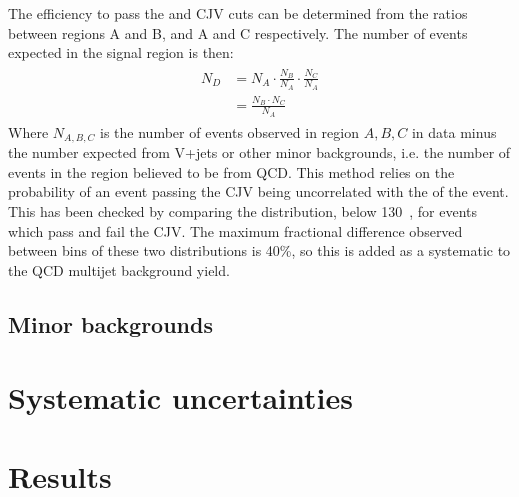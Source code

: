 The efficiency to pass the \MET and \ac{CJV} cuts can be determined from the ratios between regions A and B, and A and C respectively. The number of events expected in the signal region is then:
\begin{align}
  \label{eq:abcd}
  \begin{split}
  N_{D}&=N_{A}\cdot\frac{N_{B}}{N_{A}}\cdot\frac{N_{C}}{N_{A}}\\
  &=\frac{N_{B}\cdot N_{C}}{N_{A}}
  \end{split}
\end{align}
Where $N_{A,B,C}$ is the number of events observed in region $A,B,C$ in data minus the number expected from V+jets or other minor backgrounds, i.e. the number of events in the region believed to be from QCD. This method relies on the probability of an event passing the \ac{CJV} being uncorrelated with the \MET of the event. This has been checked by comparing the \MET distribution, below 130 \GeV\,, for events which pass and fail the \ac{CJV}. The maximum fractional difference observed between bins of these two distributions is 40\%, so this is added as a systematic to the \ac{QCD} multijet background yield.


\subsection{Minor backgrounds}%
\label{sec:promptminor}

\section{Systematic uncertainties}%
\label{sec:promptsyst}

\section{Results}%
\label{sec:promptresults}
